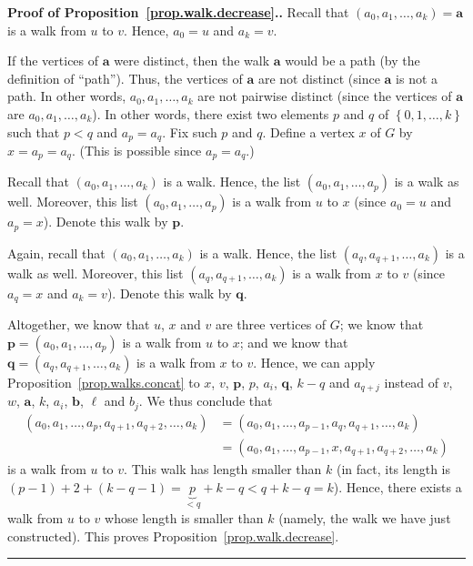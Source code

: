 \documentclass[numbers=enddot,12pt,final,onecolumn,notitlepage]{scrartcl}%
\theoremstyle{definition}
\newenvironment{proof}[1][Proof]{\noindent\textbf{#1.} }{\ \rule{0.5em}{0.5em}}
\newcommand{\set}[1]{\left\{ #1 \right\}}
\newcommand{\tup}[1]{\left( #1 \right)}
\begin{document}
\begin{proof}[Proof of Proposition~\ref{prop.walk.decrease}.]
Recall that $\tup{a_0, a_1, \ldots, a_k} = \mathbf{a}$ is a walk
from $u$ to $v$. Hence, $a_0 = u$ and $a_k = v$.

If the vertices of $\mathbf{a}$ were distinct, then the walk
$\mathbf{a}$ would be a path (by the definition of ``path''). Thus,
the vertices of $\mathbf{a}$ are not distinct (since $\mathbf{a}$ is
not a path. In other words, $a_0, a_1, \ldots, a_k$ are not
pairwise distinct (since the vertices of $\mathbf{a}$ are
$a_0, a_1, \ldots, a_k$). In other words, there exist two elements
$p$ and $q$ of $\set{0, 1, \ldots, k}$ such that $p < q$ and
$a_p = a_q$. Fix such $p$ and $q$. Define a vertex $x$ of $G$ by
$x = a_p = a_q$. (This is possible since $a_p = a_q$.)

Recall that $\tup{a_0, a_1, \ldots, a_k}$ is a walk. Hence, the list
$\tup{a_0, a_1, \ldots, a_p}$ is a walk as well. Moreover, this list
$\tup{a_0, a_1, \ldots, a_p}$ is a walk from $u$ to $x$ (since
$a_0 = u$ and $a_p = x$). Denote this walk by $\mathbf{p}$.

Again, recall that $\tup{a_0, a_1, \ldots, a_k}$ is a walk. Hence, the
list $\tup{a_q, a_{q+1}, \ldots, a_k}$ is a walk as well. Moreover,
this list $\tup{a_q, a_{q+1}, \ldots, a_k}$ is a walk from $x$ to $v$
(since $a_q = x$ and $a_k = v$). Denote this walk by $\mathbf{q}$.

Altogether, we know that $u$, $x$ and $v$ are three vertices of $G$;
we know that $\mathbf{p} = \tup{a_0, a_1, \ldots, a_p}$ is a walk from
$u$ to $x$; and we know that
$\mathbf{q} = \tup{a_q, a_{q+1}, \ldots, a_k}$ is a walk from $x$ to
$v$.
Hence, we can apply Proposition~\ref{prop.walks.concat} to
$x$, $v$, $\mathbf{p}$, $p$, $a_i$, $\mathbf{q}$, $k-q$ and $a_{q+j}$
instead of $v$, $w$, $\mathbf{a}$, $k$, $a_i$, $\mathbf{b}$, $\ell$
and $b_j$. We thus conclude that
\begin{align*}
\tup{a_0, a_1, \ldots, a_p, a_{q+1}, a_{q+2}, \ldots, a_k}
&= \tup{a_0, a_1, \ldots, a_{p-1}, a_q, a_{q+1}, \ldots, a_k} \\
&= \tup{a_0, a_1, \ldots, a_{p-1}, x, a_{q+1}, a_{q+2}, \ldots, a_k}
\end{align*}
is a walk from $u$ to $v$. This walk has length smaller than $k$
(in fact, its length is
$\tup{p-1} + 2 + \tup{k-q-1} = \underbrace{p}_{< q} + k - q
< q + k - q = k$). Hence, there exists a walk from $u$ to $v$ whose
length is smaller than $k$ (namely, the walk we have just
constructed).
This proves Proposition~\ref{prop.walk.decrease}.
\end{proof}
\end{document}
